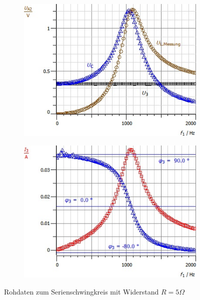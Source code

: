 \documentclass[12pt,a4paper]{article}
\begin{document}
\begin{figure}[H]
	\centering
	\begin{subfigure}{0.49\textwidth}
		\centering
		\includegraphics[width=\textwidth]{Daten/S5Ohm_Rohdaten_U.jpg}
	\end{subfigure}
	\begin{subfigure}{0.49\textwidth}
		\centering
		\includegraphics[width=\textwidth]{Daten/S5Ohm_Rohdaten_I.jpg}
	\end{subfigure}
	\caption{Rohdaten zum Serienschwingkreis mit Widerstand $R=5\Omega$}
	\label{Rohdaten_S5}
\end{figure}
\end{document}
